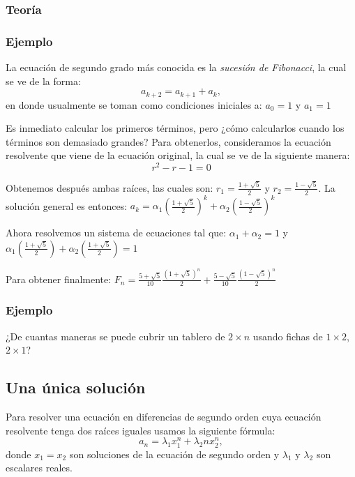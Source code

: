 \documentclass{article}
\begin{document}
\subsubsection{Teoría}
\label{sec:teoriadistintas}


\subsubsection{Ejemplo}

La ecuación de segundo grado más conocida es la \textit{sucesión de
  Fibonacci}, la cual se ve de la forma:
$$a_{k+2}=a_{k+1}+a_{k},$$
en donde usualmente se toman como condiciones iniciales a: $a_{0}=1$ y $a_{1}=1$

Es inmediato calcular los primeros términos, pero ¿cómo calcularlos
cuando los términos son demasiado grandes?  Para obtenerlos,
consideramos la ecuación resolvente que viene de la ecuación original,
la cual se ve de la siguiente manera:
$$r^2-r-1=0$$

Obtenemos después ambas raíces, las cuales son:
$r_{1}= \frac{1+\sqrt{5}}{2}$ y $r_{2}=\frac{1-\sqrt{5}}{2}$. La
solución general es entonces:
$a_{k}=\alpha_{1}(\frac{1+\sqrt{5}}{2})^{k} +
\alpha_{2}(\frac{1-\sqrt{5}}{2})^k$

Ahora resolvemos un sistema de ecuaciones tal que:
$\alpha_{1} + \alpha_{2}= 1$ y
$\alpha_{1}(\frac{1+\sqrt{5}}{2}) + \alpha_{2}(\frac{1+\sqrt{5}}{2})=1$

Para obtener finalmente:
$F_{n}= \frac{5+\sqrt{5}}{10}\frac{(1+\sqrt{5})^n}{2} +
\frac{5-\sqrt{5}}{10}\frac{(1-\sqrt{5})^n}{2}$

\subsubsection{Ejemplo}
\label{sec:fichas}

¿De cuantas maneras se puede cubrir un tablero de $2\times n$ usando
fichas de $1\times 2$, $2\times 1$?



\subsection{Una única solución}
\label{sec:unica}

Para resolver una ecuación en diferencias de segundo orden cuya
ecuación resolvente tenga dos raíces iguales usamos la siguiente fórmula:
\begin{equation}
 \label{raicesiguales}
 a_n=\lambda_1x_1^n +\lambda_2nx_2^n,
\end{equation}
donde $x_1=x_2$ son soluciones de la ecuación de segundo orden y
$\lambda_1$ y $\lambda_2$ son escalares reales.
\end{document}
